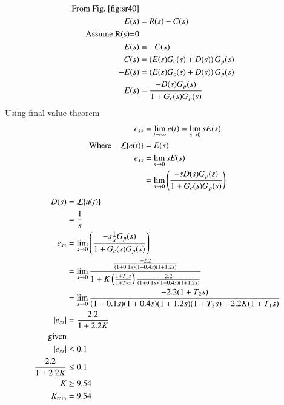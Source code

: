 \documentclass[journal,12pt,twocolumn]{IEEEtran}
\theoremstyle{remark}
\begin{document}
{\begin{align}
\text{From \figref{fig:sr40}}\notag\\
E(s) &= R(s)-C(s) \\
\text{Assume R(s)=0}\notag\\
E(s) &= -C(s) \\
C(s) &= \brak{E(s)G_c(s)+D(s)}G_p(s) \\
-E(s) &= \brak{E(s)G_c(s)+D(s)}G_p(s) \\
E(s) &= \frac{-D(s)G_p(s)}{1+G_c(s)G_p(s)} 
\end{align}
Using final value theorem 
\begin{align}
e_{ss} &= \lim_{{t \to \infty}} e(t) = \lim_{{s \to 0}} sE(s)\\
\text{Where}\quad\mathcal{L}\{e(t)\} &= E(s) \notag\\
e_{ss} &= \lim_{{s \to 0}} sE(s) \\
&= \lim_{{s \to 0}} \left(\frac{-sD(s)G_p(s)}{1+G_c(s)G_p(s)} \right) \\
\end{align}
\begin{align}
 D(s)&=\mathcal{L}\{u(t)\}  \notag\\
&=\frac{1}{s}\\
e_{ss} &=\lim_{{s \to 0}} \left(\frac{-s\frac{1}{s}G_p(s)}{1+G_c(s)G_p(s)} \right) \\
&= \lim_{{s \to 0}} \frac{\frac{-2.2}{(1+0.1s)(1+0.4s)(1+1.2s)}}{1+K\left(\frac{1+T_1s}{1+T_2s}\right)\frac{2.2}{(1+0.1s)(1+0.4s)(1+1.2s)}} \\
&= \lim_{{s \to 0}} \frac{-2.2(1+T_2s)}{(1+0.1s)(1+0.4s)(1+1.2s)(1+T_2s)+2.2K(1+T_1s)} \\
|e_{ss}| &= \frac{2.2}{1+2.2K} \\
\text{given}\notag\\ |e_{ss}|&\leq 0.1\\
\frac{2.2}{1+2.2K} &\leq 0.1 \\
K &\geq 9.54 \\
K_{\text{min}} &= 9.54
\end{align}}
    
\end{document}
